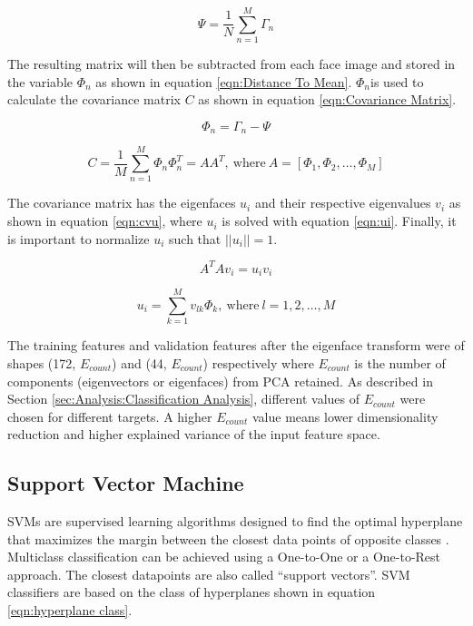 \documentclass[journal]{new-aiaa}
\begin{document}
\begin{equation}\label{eqn:Average Matrix}
  \Psi = \frac{1}{N} \sum_{n=1}^{M} \varGamma_n  
\end{equation}

The resulting matrix will then be subtracted from each face image and stored in the variable $\Phi_n$ as shown in equation \ref{eqn:Distance To Mean}.
$\Phi_n$is used to calculate the covariance matrix $C$ as shown in equation \ref{eqn:Covariance Matrix}.

\begin{equation}\label{eqn:Distance To Mean}
  \Phi_n = \varGamma_n - \Psi
\end{equation}

\begin{equation}\label{eqn:Covariance Matrix}
  C = \frac{1}{M} \sum_{n=1}^{M} \Phi_n \Phi_n^T = A A^T,\ \text{where}\ A = [\Phi_1, \Phi_2, \dots, \Phi_M]
\end{equation}

The covariance matrix has the eigenfaces $u_i$ and their respective eigenvalues $v_i$ as shown in equation \ref{eqn:cvu}, where $u_i$ is solved with equation \ref{eqn:ui}.
Finally, it is important to normalize $u_i$ such that $||u_i||=1$.
 
\begin{equation}\label{eqn:cvu}
  A^T A v_i = u_i v_i
\end{equation}

\begin{equation}\label{eqn:ui}
  u_i = \sum_{k=1}^{M} v_{lk} \Phi_k,\ \text{where}\ l = 1, 2, \dots, M
\end{equation}

The training features and validation features after the eigenface transform were of shapes (172, $E_{count}$) and (44, $E_{count}$) respectively where $E_{count}$ is the number of components (eigenvectors or eigenfaces) from PCA retained.
As described in Section \ref{sec:Analysis:Classification Analysis}, different values of $E_{count}$ were chosen for different targets.
A higher $E_{count}$ value means lower dimensionality reduction and higher explained variance of the input feature space. 

\subsection{Support Vector Machine}\label{sec:Model:SVM}
SVMs are supervised learning algorithms designed to find the optimal hyperplane that maximizes the margin between the closest data points of opposite classes \cite{708428}.
Multiclass classification can be achieved using a One-to-One or a One-to-Rest approach.
The closest datapoints are also called ``support vectors''.
SVM classifiers are based on the class of hyperplanes shown in equation \ref{eqn:hyperplane class}.
\end{document}
